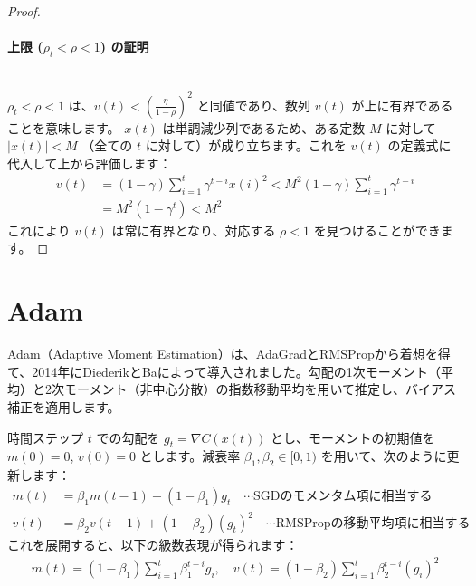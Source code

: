 \documentclass[dvipdfmx,a4paper,11pt]{jsarticle}
\begin{document}
\begin{proof}
\paragraph{上限 ($\rho_t < \rho < 1$) の証明}\ \\
$\rho_t < \rho < 1$ は、$v(t) < \left(\frac{\eta}{1-\rho}\right)^2$ と同値であり、数列 $v(t)$ が上に有界であることを意味します。
$x(t)$ は単調減少列であるため、ある定数 $M$ に対して $|x(t)| < M$ （全ての $t$ に対して）が成り立ちます。これを $v(t)$ の定義式に代入して上から評価します：
\begin{align*}
    v(t) &= (1 - \gamma) \sum_{i=1}^t \gamma^{t-i}x(i)^2 < M^2(1 - \gamma)\sum_{i=1}^t \gamma^{t-i} \\
         &= M^2(1 - \gamma^t) < M^2
\end{align*}
これにより $v(t)$ は常に有界となり、対応する $\rho < 1$ を見つけることができます。
\end{proof}

\section{Adam}
Adam（Adaptive Moment Estimation）は、AdaGradとRMSPropから着想を得て、2014年にDiederikとBaによって導入されました。勾配の1次モーメント（平均）と2次モーメント（非中心分散）の指数移動平均を用いて推定し、バイアス補正を適用します。


時間ステップ $t$ での勾配を $g_t = \nabla C(x(t))$ とし、モーメントの初期値を $m(0) = 0$, $v(0) = 0$ とします。減衰率 $\beta_1, \beta_2 \in [0, 1)$ を用いて、次のように更新します：
\begin{align*}
    m(t) &= \beta_1 m(t - 1) + (1 - \beta_1)g_t \quad\cdots \text{SGDのモメンタム項に相当する}\\
    v(t) &= \beta_2 v(t - 1) + (1 - \beta_2)(g_t)^2\quad\cdots \text{RMSPropの移動平均項に相当する}
\end{align*}
これを展開すると、以下の級数表現が得られます：
\begin{align*}
    m(t) = (1 - \beta_1) \sum_{i=1}^t \beta_1^{t-i} g_i, \quad v(t) = (1 - \beta_2) \sum_{i=1}^t \beta_2^{t-i} (g_i)^2
\end{align*}
\end{document}
